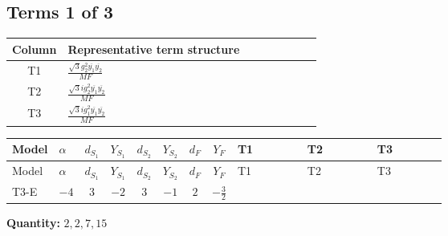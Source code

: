 \documentclass[8pt]{article}
\begin{document}
\begin{landscape}
\subsection*{Terms 1 of 3}
\begin{center}
\begin{tabular}{@{}c >{\raggedright\arraybackslash}p{0.82\linewidth}@{}}
\toprule
Column & Representative term structure \\
\midrule
T1 & \(\displaystyle \frac{\sqrt{3} g_{2}^{2} \overline{y_{1}} \overline{y_{2}}}{MF}\) \\
\midrule
T2 & \(\displaystyle \frac{\sqrt{3} i g_{2}^{2} \overline{y_{1}} \overline{y_{2}}}{MF}\) \\
\midrule
T3 & \(\displaystyle \frac{\sqrt{3} i g_{1}^{2} \overline{y_{1}} \overline{y_{2}}}{MF}\) \\
\midrule
\bottomrule
\end{tabular}
\end{center}
\smallskip
\tiny
\begin{longtable}{@{}llcccccc >{\raggedright\arraybackslash}p{0.21\linewidth} >{\raggedright\arraybackslash}p{0.21\linewidth} >{\raggedright\arraybackslash}p{0.21\linewidth}@{}}
\toprule
Model & $\alpha$ & $d_{S_1}$ & $Y_{S_1}$ & $d_{S_2}$ & $Y_{S_2}$ & $d_F$ & $Y_F$ & T1 & T2 & T3 \\
\midrule
\endfirsthead
\toprule
Model & $\alpha$ & $d_{S_1}$ & $Y_{S_1}$ & $d_{S_2}$ & $Y_{S_2}$ & $d_F$ & $Y_F$ & T1 & T2 & T3 \\
\midrule
\endhead
T3-E & $-4$ & $3$ & $-2$ & $3$ & $-1$ & $2$ & $-\frac{3}{2}$ & \scriptsize\adjustbox{max width=\linewidth}{$\begin{gathered} \frac{\sqrt{3} g_{2}^{2} \overline{y_{1}} \overline{y_{2}}}{6 MF}\end{gathered}$} & \scriptsize\adjustbox{max width=\linewidth}{$\begin{gathered} - \frac{49 \sqrt{3} i g_{2}^{2} \overline{y_{1}} \overline{y_{2}}}{24 MF}\end{gathered}$} & \scriptsize\adjustbox{max width=\linewidth}{$\begin{gathered} - \frac{9 \sqrt{3} i g_{1}^{2} \overline{y_{1}} \overline{y_{2}}}{8 MF}\end{gathered}$} \\
\midrule
\bottomrule
\end{longtable}
\clearpage
\noindent\textbf{Quantity: }$\mathrm{2,2,7,15}$\par\smallskip

\end{landscape}
\end{document}
